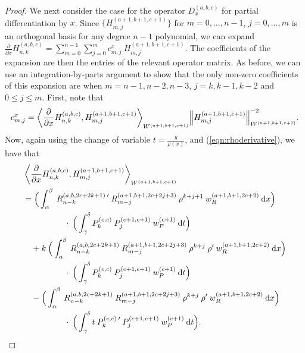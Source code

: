 \documentclass[11pt, oneside]{article}   	%
\newcommand{\pddx}{\frac{\partial}{\partial x}}
\newcommand{\hdop}{H}
\newcommand{\jac}{{P}}
\newcommand{\genjac}{R}
\newcommand{\genjacnmk}{\genjac_{n-k}}
\newcommand{\genjacmmj}{\genjac_{m-j}}
\newcommand{\genjacw}{w_\genjac}
\newcommand{\jacw}{w_P}
\newcommand{\hdopnkabc}{\hdop_{n,k}^{(a,b,c)}}
\begin{document}
\begin{proof}
We next consider the case for the operator $D_x^{(a,b,c)}$ for partial differentiation by $x$. Since $\{\hdop^{(a+1, b+1, c+1)}_{m,j}\}$ for $m = 0,\dots,n-1$, $j = 0,\dots,m$ is an orthogonal basis for any degree $n-1$ polynomial, we can expand $\pddx \hdopnkabc = \sum_{m=0}^{n-1} \sum_{j=0}^m c_{m,j}^x \: \hdop^{(a+1, b+1, c+1)}_{m,j}$. The coefficients of the expansion are then the entries of the relevant operator matrix. As before, we can use an integration-by-parts argument to show that the only non-zero coefficients of this expansion are when $m = n-1, n-2, n-3$, $j = k, k-1, k-2$ and $0 \le j \le m$. First, note that
\begin{align*}
	c_{m,j}^x = {\ip<\pddx \hdopnkabc, \hdop^{(a+1, b+1, c+1)}_{m,j} >_{W^{(a+1, b+1, c+1)}}}{\norm{\hdop^{(a+1, b+1, c+1)}_{m,j}}^{-2}_{W^{(a+1, b+1, c+1)}}}.
\end{align*}
Now, again using the change of variable $t= \frac{y}{\rho(x)}$, and (\ref{eqn:rhoderivative}), we have that
\begin{align*}
	&\ip<\pddx \hdopnkabc, \hdop^{(a+1, b+1, c+1)}_{m,j} >_{W^{(a+1, b+1, c+1)}} \nonumber \\ 
	&= \Big( \int_\alpha^\beta \: \genjacnmk^{(a, b, 2c+2k+1) \: \prime} \: \genjacmmj^{(a+1, b+1, 2c+2j+3)} \: \rho^{k+j+1} \: \genjacw^{(a+1, b+1, 2c+2)} \: \D x \Big) \\
	&\quad \quad \quad \quad \quad \cdot \: \Big( \int_\gamma^\delta \jac_k^{(c,c)} \: \jac_j^{(c+1,c+1)} \: \jacw^{(c+1)} \: \D t \Big) \\ 
	& \quad + k \: \Big( \int_\alpha^\beta \: \genjacnmk^{(a, b, 2c+2k+1)} \: \genjacmmj^{(a+1, b+1, 2c+2j+3)} \: \rho^{k+j} \: \rho' \: \genjacw^{(a+1, b+1, 2c+2)} \: \D x \Big) \\
	& \quad \quad \quad \quad \quad \cdot \: \Big( \int_\gamma^\delta \jac_k^{(c,c)} \: \jac_j^{(c+1,c+1)} \: \jacw^{(c+1)} \: \D t \Big) \\
	& \quad - \Big( \int_\alpha^\beta \: \genjacnmk^{(a, b, 2c+2k+1)} \: \genjacmmj^{(a+1, b+1, 2c+2j+3)} \: \rho^{k+j} \: \rho' \: \genjacw^{(a+1, b+1, 2c+2)} \: \D x \Big) \\
	& \quad \quad \quad \quad \quad \cdot \: \Big( \int_\gamma^\delta t \: \jac_k^{(c,c) \: \prime} \: \jac_j^{(c+1,c+1)} \: \jacw^{(c+1)} \: \D t \Big). \\
\end{align*}

\end{proof}
\end{document}
